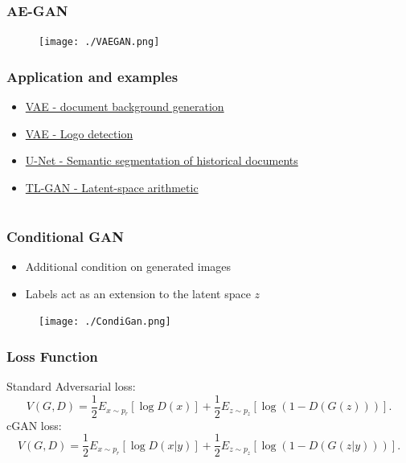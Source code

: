 \begin{frame}
\frametitle{AE-GAN}
\begin{figure}[!ht]
	\centering
	\texttt{[image: ./VAEGAN.png]}
\end{figure}

\end{frame}

\begin{frame}
\frametitle{Application and examples}
\begin{itemize}
	\item \href{D:/Python_scripts/FileGenerator/data/outputs/images}{VAE - document background generation}
	\item \href{D:/Dropbox/MPV/Sencor.png}{VAE - Logo detection}
	\item \href{D:/Python_scripts/Naki/data_results}{U-Net - Semantic segmentation of historical documents}
	\item \href{https://www.kaggle.com/summitkwan/tl-gan-demo}{TL-GAN - Latent-space arithmetic}
\end{itemize}
\end{frame}


\section[Condi-GAN]{}

\begin{frame}
\frametitle{Conditional GAN}
\begin{itemize}
	\item Additional condition on generated images
	\item Labels act as an extension to the latent space $z$	
\end{itemize}
	\begin{figure}[!ht]
	\centering
	\texttt{[image: ./CondiGan.png]}
	\end{figure}
\end{frame}

\begin{frame}
\frametitle{Loss Function}
Standard Adversarial loss:
\begin{equation}
V(G,D) = \frac{1}{2}E_{x\sim p_r}[\log D(x)]+\frac{1}{2}E_{z\sim p_z}[\log (1-D(G(z)))].
\end{equation}
cGAN loss:
\begin{equation}
V(G,D) = \frac{1}{2}E_{x\sim p_r}[\log D(x|y)]+\frac{1}{2}E_{z\sim p_z}[\log (1-D(G(z|y)))].
\end{equation}
\end{frame}

